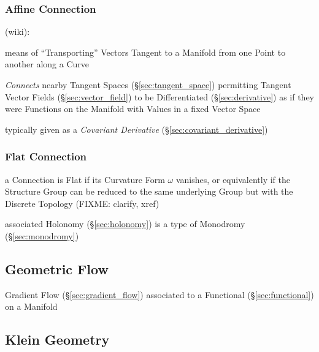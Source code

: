 \subsubsection{Affine Connection}\label{sec:affine_connection}

(wiki):

means of ``Transporting'' Vectors Tangent to a Manifold from one Point to
another along a Curve

\emph{Connects} nearby Tangent Spaces (\S\ref{sec:tangent_space}) permitting
Tangent Vector Fields (\S\ref{sec:vector_field}) to be Differentiated
(\S\ref{sec:derivative}) as if they were Functions on the Manifold with Values
in a fixed Vector Space

typically given as a \emph{Covariant Derivative}
(\S\ref{sec:covariant_derivative})



\subsubsection{Flat Connection}\label{sec:flat_connection}

a Connection is Flat if its Curvature Form $\omega$ vanishes, or equivalently
if the Structure Group can be reduced to the same underlying Group but with the
Discrete Topology (FIXME: clarify, xref)

associated Holonomy (\S\ref{sec:holonomy}) is a type of Monodromy
(\S\ref{sec:monodromy})



\subsection{Geometric Flow}\label{sec:geometric_flow}

Gradient Flow (\S\ref{sec:gradient_flow}) associated to a Functional
(\S\ref{sec:functional}) on a Manifold



\subsection{Klein Geometry}\label{sec:klein_geometry}

